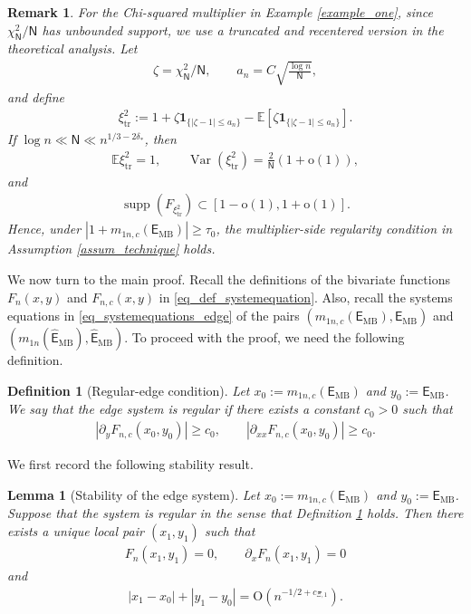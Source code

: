 \documentclass[12pt]{article}
\theoremstyle{plain}
\newtheorem{lemma}{Lemma}[section]
\newtheorem{remark}{Remark}[section]
\newtheorem{definition}{Definition}[section]
\numberwithin{equation}{section}
\begin{document}
\begin{remark}
	For the Chi-squared multiplier in Example \ref{example_one}, since $\chi_{\mathsf{N}}^2/\mathsf{N}$ has unbounded support, we use a truncated and recentered version in the theoretical analysis. Let
	\begin{align*}
		\zeta=\chi_{\mathsf{N}}^2/\mathsf{N},\qquad a_n=C\sqrt{\frac{\log n}{\mathsf{N}}},
	\end{align*}
	and define
	\begin{align*}
		\xi_{\operatorname{tr}}^2:=
		1+\zeta\mathbf 1_{\{|\zeta-1|\le a_n\}}-
		\mathbb E\left[\zeta\mathbf 1_{\{|\zeta-1|\le a_n\}}\right].
	\end{align*}
	If $\log n\ll \mathsf{N}\ll n^{1/3-2\delta_{*}}$, then
	\begin{align*}
		\mathbb E\xi_{\operatorname{tr}}^2=1,\qquad
		\operatorname{Var}(\xi_{\operatorname{tr}}^2)=\frac{2}{\mathsf{N}}(1+\mathrm{o}(1)),
	\end{align*}
	and
	\begin{align*}
		\operatorname{supp}(F_{\xi_{\operatorname{tr}}^2})
		\subset [1-\mathrm{o}(1),1+\mathrm{o}(1)].
	\end{align*}
	Hence, under $|1+m_{1n,c}(\mathsf{E}_{\mathrm{MB}})|\ge \tau_0$, the multiplier-side regularity condition in Assumption \ref{assum_technique} holds.
\end{remark}


We now turn to the main proof. Recall the definitions of the bivariate functions $F_n(x,y)$ and $F_{n,c}(x,y)$ in \eqref{eq_def_systemequation}. Also, recall the systems equations in \eqref{eq_systemequations_edge} of the pairs $(m_{1n,c}(\mathsf{E}_{\mathrm{MB}}),\mathsf{E}_{\mathrm{MB}})$ and $(m_{1n}(\widehat{\mathsf{E}}_{\mathrm{MB}}),\widehat{\mathsf{E}}_{\mathrm{MB}})$. To proceed with the proof, we need the following definition.
\begin{definition}[Regular-edge condition]\label{def_regularedge}
	Let $x_0:=m_{1n,c}(\mathsf E_{\mathrm{MB}})$ and $y_0:=\mathsf E_{\mathrm{MB}}$. We say that the edge system is regular if there exists a constant $c_0>0$ such that
	\begin{align}\label{eq_regular_edge_condition}
		|\partial_yF_{n,c}(x_0,y_0)|\ge c_0,
		\qquad
		|\partial_{xx}F_{n,c}(x_0,y_0)|\ge c_0.
	\end{align}
\end{definition}
We first record the following stability result.
\begin{lemma}[Stability of the edge system]
	\label{lem_stabilityargument}
	Let $x_0:=m_{1n,c}(\mathsf E_{\mathrm{MB}})$ and $y_0:=\mathsf E_{\mathrm{MB}}$. Suppose that the system is regular in the sense that Definition \ref{def_regularedge} holds.
	Then there exists a unique local pair $(x_1,y_1)$ such that
	\begin{align*}
		F_n(x_1,y_1)=0,
		\qquad
		\partial_xF_n(x_1,y_1)=0
	\end{align*}
	and
	\begin{align*}
		|x_1-x_0|+|y_1-y_0|=\mathrm{O}(n^{-1/2+c_{\Xi,1}}).
	\end{align*}
\end{lemma}
\end{document}
